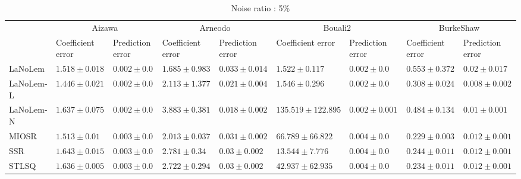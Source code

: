 \begin{table*}
\centering
\caption{Noise ratio : 5\%}
\label{}
\scalebox{0.7}
{
\begin{tabular}{lllllllll}
\toprule
 & \multicolumn{2}{c}{Aizawa} & \multicolumn{2}{c}{Arneodo} & \multicolumn{2}{c}{Bouali2} & \multicolumn{2}{c}{BurkeShaw} \\
 & Coefficient error & Prediction error & Coefficient error & Prediction error & Coefficient error & Prediction error & Coefficient error & Prediction error \\
\midrule
LaNoLem & $1.518\pm 0.018$ & $\mathbf{0.002}\pm 0.0$ & $\mathbf{1.685}\pm 0.983$ & $0.033\pm 0.014$ & $\mathbf{1.522}\pm 0.117$ & $\mathbf{0.002}\pm 0.0$ & $0.553\pm 0.372$ & $0.02\pm 0.017$ \\
LaNoLem-L & $\mathbf{1.446}\pm 0.021$ & $0.002\pm 0.0$ & $2.113\pm 1.377$ & $0.021\pm 0.004$ & $1.546\pm 0.296$ & $0.002\pm 0.0$ & $0.308\pm 0.024$ & $\mathbf{0.008}\pm 0.002$ \\
LaNoLem-N & $1.637\pm 0.075$ & $0.002\pm 0.0$ & $3.883\pm 0.381$ & $\mathbf{0.018}\pm 0.002$ & $135.519\pm 122.895$ & $0.002\pm 0.001$ & $0.484\pm 0.134$ & $0.01\pm 0.001$ \\
MIOSR & $1.513\pm 0.01$ & $0.003\pm 0.0$ & $2.013\pm 0.037$ & $0.031\pm 0.002$ & $66.789\pm 66.822$ & $0.004\pm 0.0$ & $\mathbf{0.229}\pm 0.003$ & $0.012\pm 0.001$ \\
SSR & $1.643\pm 0.015$ & $0.003\pm 0.0$ & $2.781\pm 0.34$ & $0.03\pm 0.002$ & $13.544\pm 7.776$ & $0.004\pm 0.0$ & $0.244\pm 0.011$ & $0.012\pm 0.001$ \\
STLSQ & $1.636\pm 0.005$ & $0.003\pm 0.0$ & $2.722\pm 0.294$ & $0.03\pm 0.002$ & $42.937\pm 62.935$ & $0.004\pm 0.0$ & $0.234\pm 0.011$ & $0.012\pm 0.001$ \\

\midrule


\end{tabular}}
\end{table*}
